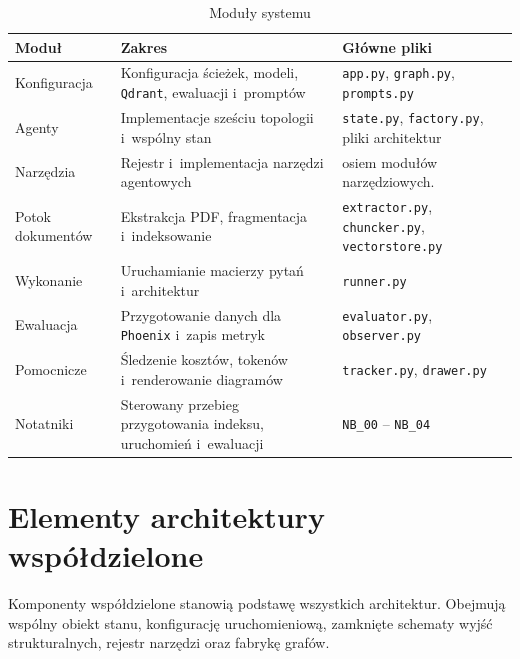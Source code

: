 \begin{table}[H]
  \caption{Moduły systemu}\label{tab:moduly-systemu}
  \centering
  \small
  \begin{tabularx}{\textwidth}{@{} l L L @{}}
    \toprule
    \textbf{Moduł}
    & \textbf{Zakres}
    & \textbf{Główne pliki}                                     \\
    \midrule
    Konfiguracja
    & Konfiguracja ścieżek, modeli, \texttt{Qdrant},
    ewaluacji i~promptów
    & \texttt{app.py}, \texttt{graph.py}, \texttt{prompts.py}   \\
    Agenty
    & Implementacje sześciu topologii i~wspólny stan
    & \texttt{state.py}, \texttt{factory.py}, pliki architektur \\
    Narzędzia
    & Rejestr i~implementacja narzędzi agentowych
    & osiem modułów narzędziowych.                              \\
    Potok dokumentów
    & Ekstrakcja PDF, fragmentacja i~indeksowanie
    & \texttt{extractor.py}, \texttt{chuncker.py},
    \texttt{vectorstore.py}                                      \\
    Wykonanie
    & Uruchamianie macierzy pytań i~architektur
    & \texttt{runner.py}                                        \\
    Ewaluacja
    & Przygotowanie danych dla \texttt{Phoenix} i~zapis metryk
    & \texttt{evaluator.py}, \texttt{observer.py}               \\
    Pomocnicze
    & Śledzenie kosztów, tokenów i~renderowanie diagramów
    & \texttt{tracker.py},
    \texttt{drawer.py}                                           \\
    Notatniki
    & Sterowany przebieg przygotowania indeksu,
    uruchomień i~ewaluacji
    & \texttt{NB\_00} -- \texttt{NB\_04}                        \\
    \bottomrule
  \end{tabularx}
\end{table}

\section{Elementy architektury współdzielone}\label{sec:elementy-architektury-wspoldzielone}

Komponenty współdzielone stanowią podstawę wszystkich architektur. Obejmują
wspólny obiekt stanu, konfigurację uruchomieniową, zamknięte schematy wyjść
strukturalnych, rejestr narzędzi oraz fabrykę grafów.
